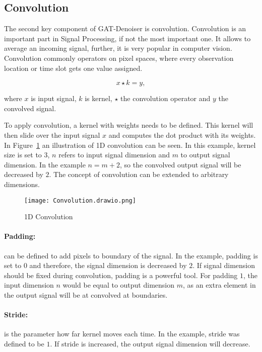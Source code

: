 \subsection{Convolution}
The second key component of GAT-Denoiser is convolution.
Convolution is an important part in Signal Processing, if not the most important one.
It allows to average an incoming signal, further, it is very popular in computer vision.
Convolution commonly operators on pixel spaces, where every observation location or time slot gets one value assigned.

\begin{equation}
  x \star k = y,
\end{equation}

where $x$ is input signal, $k$ is kernel, $\star$ the convolution operator and $y$ the convolved signal.

To apply convolution, a kernel with weights needs to be defined. 
This kernel will then slide over the input signal $x$ and computes the dot product with its weights.
In Figure~\ref{fig:1d-convolution} an illustration of 1D convolution can be seen. In this example,
kernel size is set to 3, $n$ refers to input signal dimension and $m$ to output signal dimension.
In the example  $ n = m + 2$, so the convolved output signal will be decreased by $2$.
The concept of convolution can be extended to arbitrary dimensions.

\begin{figure}[H]
  \centering
  \label{fig:1d-convolution}
  \texttt{[image: Convolution.drawio.png]}
  \caption{1D Convolution}
\end{figure}

\paragraph{Padding:} 
can be defined to add pixels to boundary of the signal.
In the example, padding is set to $0$ and therefore, the signal dimension is decreased by $2$.
If signal dimension should be fixed during convolution, padding is a powerful tool. For padding $1$,
the input dimension $n$ would be equal to output dimension $m$, as an extra element in the output signal
will be at convolved at boundaries.


\paragraph{Stride:}
is the parameter how far kernel moves each time. In the example, stride was defined to be $1$.
If stride is increased, the output signal dimension will decrease.


